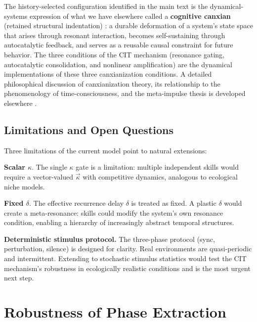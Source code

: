 \documentclass[12pt,a4paper]{article}
\begin{document}
The history-selected configuration identified in the main text is the dynamical-systems expression of what we have elsewhere called a \textbf{cognitive canxian} (retained structural indentation) \cite{cai2024law}: a durable deformation of a system's state space that arises through resonant interaction, becomes self-sustaining through autocatalytic feedback, and serves as a reusable causal constraint for future behavior. The three conditions of the CIT mechanism (resonance gating, autocatalytic consolidation, and nonlinear amplification) are the dynamical implementations of these three canxianization conditions. A detailed philosophical discussion of canxianization theory, its relationship to the phenomenology of time-consciousness, and the meta-impulse thesis is developed elsewhere \cite{cai2024law}.



\subsection{Limitations and Open Questions}



Three limitations of the current model point to natural extensions:



\textbf{Scalar $\kappa$}. The single $\kappa$ gate is a limitation: multiple independent skills would require a vector-valued $\vec{\kappa}$ with competitive dynamics, analogous to ecological niche models.



\textbf{Fixed $\delta$}. The effective recurrence delay $\delta$ is treated as fixed. A plastic $\delta$ would create a meta-resonance: skills could modify the system's own resonance condition, enabling a hierarchy of increasingly abstract temporal structures.



\textbf{Deterministic stimulus protocol.} The three-phase protocol (sync, perturbation, silence) is designed for clarity. Real environments are quasi-periodic and intermittent. Extending to stochastic stimulus statistics would test the CIT mechanism's robustness in ecologically realistic conditions and is the most urgent next step.



\section{Robustness of Phase Extraction}
\label{sec:phase_robustness}
\end{document}
